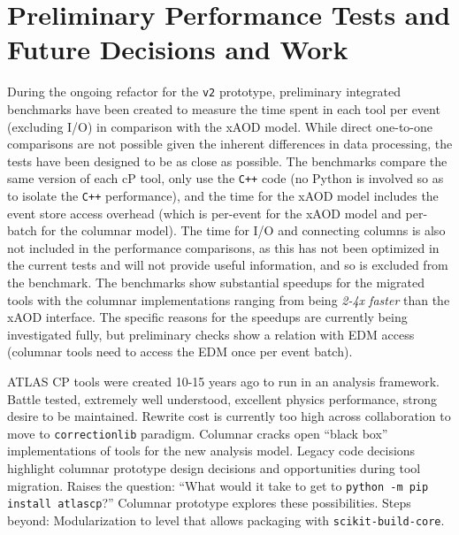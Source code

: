 \section{Preliminary Performance Tests and Future Decisions and Work}\label{sec:conclusions}

During the ongoing refactor for the \texttt{v2} prototype, preliminary integrated benchmarks have been created to measure the time spent in each tool per event (excluding I/O) in comparison with the xAOD model.
While direct one-to-one comparisons are not possible given the inherent differences in data processing, the tests have been designed to be as close as possible.
The benchmarks compare the same version of each cP tool, only use the \texttt{C++} code (no Python is involved so as to isolate the \texttt{C++} performance), and the time for the xAOD model includes the event store access overhead (which is per-event for the xAOD model and per-batch for the columnar model).
The time for I/O and connecting columns is also not included in the performance comparisons, as this has not been optimized in the current tests and will not provide useful information, and so is excluded from the benchmark.
The benchmarks show substantial speedups for the migrated tools with the columnar implementations ranging from being \emph{2-4x faster} than the xAOD interface.
The specific reasons for the speedups are currently being investigated fully, but preliminary checks show a relation with EDM access (columnar tools need to access the EDM once per event batch).

ATLAS CP tools were created 10-15 years ago to run in an analysis framework.
Battle tested, extremely well understood, excellent physics performance, strong desire to be maintained.
Rewrite cost is currently too high across collaboration to move to \texttt{correctionlib} paradigm.
Columnar cracks open ``black box'' implementations of tools for the new analysis model.
Legacy code decisions highlight columnar prototype design decisions and opportunities during tool migration.
Raises the question: ``What would it take to get to \texttt{python -m pip install atlascp}?''
Columnar prototype explores these possibilities.
Steps beyond: Modularization to level that allows packaging with \texttt{scikit-build-core}.
